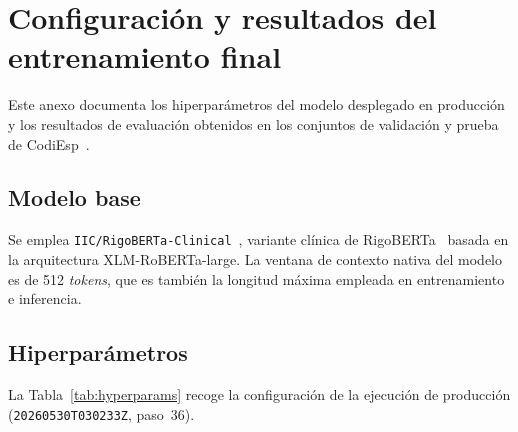 \chapter{Configuración y resultados del entrenamiento final}
\label{cap:AnexoH}

Este anexo documenta los hiperparámetros del modelo desplegado en producción y los resultados de evaluación obtenidos en los conjuntos de validación y prueba de CodiEsp~\cite{miranda2020}.

\section{Modelo base}

Se emplea \texttt{IIC/RigoBERTa-Clinical}~\cite{garciasubies2026rigobertaclinical}, variante clínica de RigoBERTa~\cite{vacaserrano2022rigoberta} basada en la arquitectura XLM-RoBERTa-large. La ventana de contexto nativa del modelo es de 512 \emph{tokens}, que es también la longitud máxima empleada en entrenamiento e inferencia.

\section{Hiperparámetros}

La Tabla~\ref{tab:hyperparams} recoge la configuración de la ejecución de producción (\texttt{20260530T030233Z}, paso~36).


